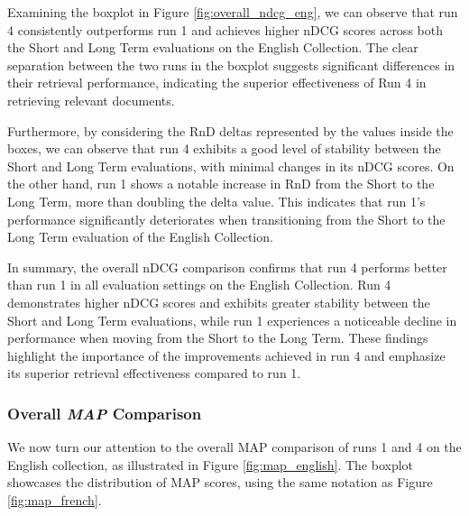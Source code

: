 Examining the boxplot in Figure \ref{fig:overall_ndcg_eng}, we can observe that run 4 consistently outperforms run 1 and achieves higher \ac{nDCG} scores across both the Short and Long Term evaluations on the English Collection.  
The clear separation between the two runs in the boxplot suggests significant differences in their retrieval performance, indicating the superior effectiveness of Run 4 in retrieving relevant documents.

Furthermore, by considering the \ac{RnD} deltas represented by the values inside the boxes, we can observe that run 4 exhibits a good level of stability between the Short and Long Term evaluations, with minimal changes in its \ac{nDCG} scores. 
On the other hand, run 1 shows a notable increase in \ac{RnD} from the Short to the Long Term, more than doubling the delta value. 
This indicates that run 1's performance significantly deteriorates when transitioning from the Short to the Long Term evaluation of the English Collection.

In summary, the overall \ac{nDCG} comparison confirms that run 4 performs better than run 1 in all evaluation settings on the English Collection. 
Run 4 demonstrates higher \ac{nDCG} scores and exhibits greater stability between the Short and Long Term evaluations, while run 1 experiences a noticeable decline in performance when moving from the Short to the Long Term. 
These findings highlight the importance of the improvements achieved in run 4 and emphasize its superior retrieval effectiveness compared to run 1.

\newpage
\enlargethispage{6\baselineskip}
\subsubsection{Overall \textit{MAP} Comparison} \label{sec:map_comparison_eng}

We now turn our attention to the overall \ac{MAP} comparison of runs 1 and 4 on the English collection, as illustrated in Figure \ref{fig:map_english}. 
The boxplot showcases the distribution of \ac{MAP} scores, using the same notation as Figure \ref{fig:map_french}.

